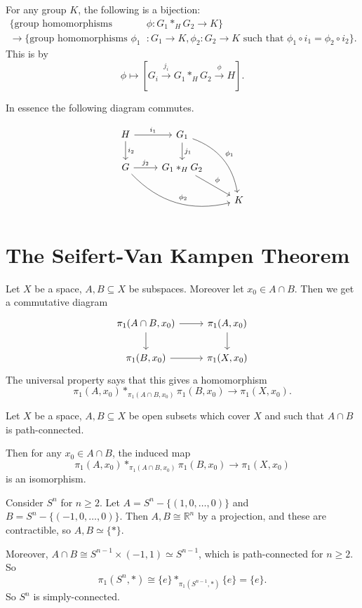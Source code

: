 \documentclass[12pt]{article}
\begin{document}
\begin{lemma}
	For any group $K$, the following is a bijection:
	\begin{align*}
		\{\text{group homomorphisms } &\phi : G_1 \ast_H G_2 \to K\} \\
		\to \{\text{group homomorphisms } \phi_1 &: G_1 \to K, \phi_2 : G_2 \to K \text{ such that } \phi_1 \circ i_1 = \phi_2 \circ i_2\}.
	\end{align*}
	This is by
	\[
		\phi \mapsto [G_i \overset{j_i}{\to} G_1 \ast_H G_2 \overset{\phi}{\to} H].
	\]
\end{lemma}

In essence the following diagram commutes.

\[
\begin{tikzcd}
	H \arrow[r, "i_1"]\arrow[d, "i_2"] & G_1 \arrow[d, "j_1"] \arrow[ddr, bend left, "\phi_1"] &\\
	G \arrow[r, "j_2"] \arrow[drr, bend right, "\phi_2"] & G_1 \ast_H G_2 \arrow[dr, "\phi"] & \\
			   & & K
\end{tikzcd}
\]

\newpage

\section{The Seifert-Van Kampen Theorem}
\label{sec:svk_thm}

Let $X$ be a space, $A, B \subseteq X$ be subspaces. Moreover let $x_0 \in A \cap B$. Then we get a commutative diagram
\[
\begin{tikzcd}
	\pi_1(A \cap B, x_0) \arrow[r] \arrow[d] & \pi_1(A, x_0) \arrow[d] \\
	\pi_1(B, x_0) \arrow[r] & \pi_1(X, x_0)
\end{tikzcd}
\]
The universal property says that this gives a homomorphism
\[
\pi_1(A, x_0) \ast_{\pi_1(A \cap B, x_0)} \pi_1(B, x_0) \to \pi_1(X, x_0).
\]

\begin{theorem}
	Let $X$ be a space, $A, B \subseteq X$ be open subsets which cover $X$ and such that $A \cap B$ is path-connected.

	Then for any $x_0 \in A \cap B$, the induced map
	\[
	\pi_1(A, x_0) \ast_{\pi_1(A \cap B, x_0)} \pi_1(B, x_0) \to \pi_1(X, x_0)
	\]
	is an isomorphism.
\end{theorem}

\begin{exbox}
	Consider $S^n$ for $n \geq 2$. Let $A = S^n - \{(1, 0, \ldots, 0)\}$ and $B = S^n - \{(-1, 0, \ldots, 0)\}$. Then $A, B \cong \mathbb{R}^n$ by a projection, and these are contractible, so $A , B \simeq \{\ast\}$.

	Moreover, $A \cap B \cong S^{n-1} \times (-1, 1) \simeq S^{n-1}$, which is path-connected for $n \geq 2$. So
	\[
		\pi_1(S^n, \ast) \cong \{e\} \ast_{\pi_1(S^{n-1}, \ast)} \{e\} = \{e\}.
	\]
	So $S^n$ is simply-connected.
\end{exbox}
\end{document}
